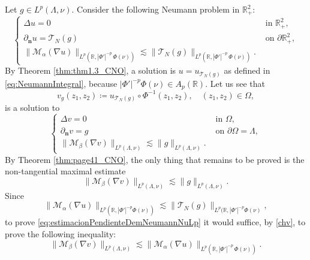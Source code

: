 \documentclass[12pt]{amsart}
\newcommand{\R}{\mathbb{R}}
\theoremstyle{plain}
\theoremstyle{definition}
\numberwithin{equation}{section}
\begin{document}
        
        Let $g\in L^p(\Lambda, \nu)$. Consider the following Neumann problem in $\R_{+}^{2}$:
        \begin{equation}\label{eq:problemaSemiplanoProblemaNeumannPesoNu}
            \begin{cases}
            \Delta u=0 & \text{ in } \R_{+}^{2},\\
            \partial_{\mathbf{n}}u= \mathcal{T}_{N}(g) & \text{ on }\partial \R_{+}^{2},\\ 
            \|\mathcal{M}_{\alpha}(\nabla u)\|_{L^p(\R,|\Phi'|^{-p}\, \Phi(\nu))}\lesssim \|\mathcal{T}_N(g)\|_{L^p(\R,|\Phi'|^{-p}\, \Phi(\nu))}. &
            \end{cases}
        \end{equation}
        By Theorem \ref{thm:thm1.3_CNO}, a solution is $u=u_{\mathcal{T}_N(g)}$ as defined in \eqref{eq:NeumannIntegral}, because $|\Phi'|^{-p}\Phi(\nu)\in A_p(\R)$. Let us see that
        \[
        v_{g}(z_1,z_2)
        \coloneqq 
        u_{\mathcal{T}_{N}(g)}\circ \Phi^{-1}(z_1,z_2),\quad (z_1,z_2)\in \Omega,
        \]
        is a solution to
        \begin{equation}\label{eq:problemaDominioProblemaNeumannPesoNu}
        \begin{cases}
            \Delta v=0 & \text{ in }\Omega, \\
            \partial_{\mathbf{n}}v=g & \text{ on }\partial\Omega=\Lambda,\\
            \|\mathcal{M}_{\beta}(\nabla v)\|_{L^p(\Lambda,\nu)}\lesssim \|g\|_{L^p(\Lambda,\nu)}.
        \end{cases}
        \end{equation}
        By Theorem \ref{thm:page41_CNO}, the only thing that remains to be proved is the non-tangential maximal estimate
        \begin{equation}\label{eq:estimacionPendienteDemNeumannNuLp}
        \|\mathcal{M}_{\beta}(\nabla v)\|_{L^p(\Lambda,\nu)}\lesssim \|g\|_{L^p(\Lambda,\nu)}.
        \end{equation}
 Since
        \[
        \|\mathcal{M}_{\alpha}(\nabla u)\|_{L^p(\R,|\Phi'|^{-p}\Phi(\nu))}
        \lesssim 
        \|\mathcal{T}_{N}(g)\|_{L^p(\R,|\Phi'|^{-p}\Phi(\nu)},
        \]
        to prove \eqref{eq:estimacionPendienteDemNeumannNuLp} it would suffice, by \eqref{chv},  to prove the following inequality:
        \[
        \|\mathcal{M}_{\beta}(\nabla v)\|_{L^p(\Lambda,\nu)}
        \lesssim 
        \|\mathcal{M}_{\alpha}(\nabla u)\|_{L^p(\R,|\Phi'|^{-p}\, \Phi(\nu))}.
        \]
\end{document}
